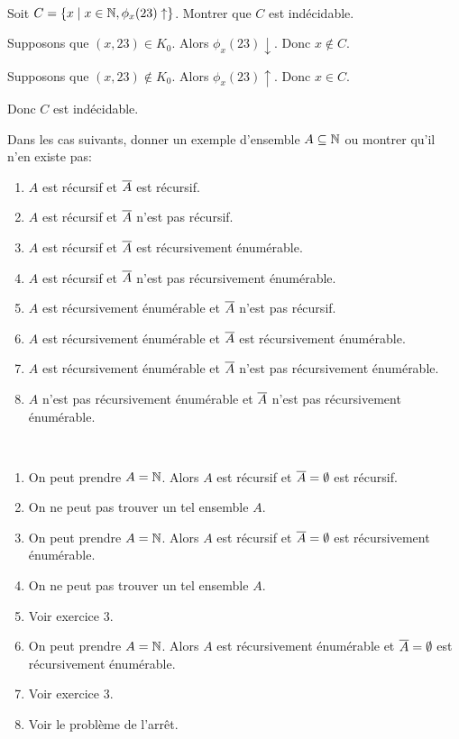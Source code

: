 \documentclass[french,a4paper,10pt]{article}
\begin{document}
    \begin{td-exo}\,\\
        Soit $C=\{x\mid x\in \mathbb{N},\phi_x(23)\uparrow\}$.
        Montrer que $C$ est indécidable.
    \end{td-exo}

    \begin{td-sol}
        Supposons que $(x,23)\in K_0$. Alors $\phi_x(23)\downarrow$. Donc $x\notin C$.

        Supposons que $(x,23)\notin K_0$. Alors $\phi_x(23)\uparrow$. Donc $x\in C$.

        Donc $C$ est indécidable.
    \end{td-sol}

    \begin{td-exo}[8]
        Dans les cas suivants, donner un exemple d'ensemble $A\subseteq \mathbb{N}$ ou montrer qu'il n'en existe pas:
        \begin{enumerate}
            \item $A$ est récursif et $\overline{A}$ est récursif.
            \item $A$ est récursif et $\overline{A}$ n'est pas récursif.
            \item $A$ est récursif et $\overline{A}$ est récursivement énumérable.
            \item $A$ est récursif et $\overline{A}$ n'est pas récursivement énumérable.
            \item $A$ est récursivement énumérable et $\overline{A}$ n'est pas récursif.
            \item $A$ est récursivement énumérable et $\overline{A}$ est récursivement énumérable.
            \item $A$ est récursivement énumérable et $\overline{A}$ n'est pas récursivement énumérable.
            \item $A$ n'est pas récursivement énumérable et $\overline{A}$ n'est pas récursivement énumérable.
        \end{enumerate}
    \end{td-exo}

    \begin{td-sol}\,
        \begin{enumerate}
            \item On peut prendre $A=\mathbb{N}$. Alors $A$ est récursif et $\overline{A}=\emptyset$ est récursif.
            \item On ne peut pas trouver un tel ensemble $A$.
            \item On peut prendre $A=\mathbb{N}$. Alors $A$ est récursif et $\overline{A}=\emptyset$ est récursivement énumérable.
            \item On ne peut pas trouver un tel ensemble $A$.
            \item Voir exercice 3.
            \item On peut prendre $A=\mathbb{N}$. Alors $A$ est récursivement énumérable et $\overline{A}=\emptyset$ est récursivement énumérable.
            \item Voir exercice 3.
            \item Voir le problème de l'arrêt.
        \end{enumerate}
    \end{td-sol}
\end{document}
